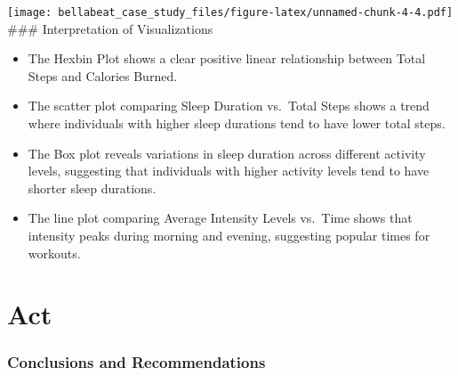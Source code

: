\documentclass[
]{article}
\providecommand{\tightlist}{%
  \setlength{\itemsep}{0pt}\setlength{\parskip}{0pt}}
\begin{document}
\texttt{[image: bellabeat\_case\_study\_files/figure-latex/unnamed-chunk-4-4.pdf]}
\#\#\# Interpretation of Visualizations

\begin{itemize}
\tightlist
\item
  The Hexbin Plot shows a clear positive linear relationship between
  Total Steps and Calories Burned.
\item
  The scatter plot comparing Sleep Duration vs.~Total Steps shows a
  trend where individuals with higher sleep durations tend to have lower
  total steps.
\item
  The Box plot reveals variations in sleep duration across different
  activity levels, suggesting that individuals with higher activity
  levels tend to have shorter sleep durations.
\item
  The line plot comparing Average Intensity Levels vs.~Time shows that
  intensity peaks during morning and evening, suggesting popular times
  for workouts.
\end{itemize}

\hypertarget{act}{%
\section{Act}\label{act}}

\hypertarget{conclusions-and-recommendations}{%
\subsubsection{Conclusions and
Recommendations}\label{conclusions-and-recommendations}}
\end{document}

